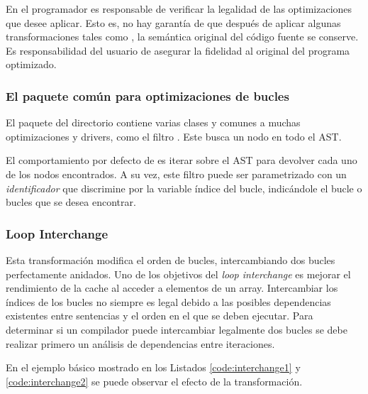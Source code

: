En \yacf{} el programador es responsable de verificar la legalidad de las optimizaciones 
que desee aplicar.
Esto es, no hay garantía de que después de aplicar algunas transformaciones tales como 
\tiling{},
la semántica original del código fuente se conserve.
Es responsabilidad del usuario de \yacf{} asegurar la fidelidad al original del programa
optimizado.
\subsubsection{El paquete común para optimizaciones de bucles	}
\noindent
El paquete  del directorio  contiene
varias clases  y  comunes a muchas optimizaciones y drivers, como
el filtro .
Este  busca un nodo  en todo el \ac{AST}.

El comportamiento por defecto de  es iterar sobre el \ac{AST} para devolver
cada uno de los nodos  encontrados.
A su vez, este filtro puede ser parametrizado con un \textit{identificador} que 
discrimine por la variable índice del bucle, indicándole el bucle o bucles que se desea encontrar.
\subsubsection{Loop Interchange}
\label{subsec:interchange}

\noindent
Esta transformación modifica el orden de bucles, intercambiando dos bucles perfectamente anidados.
Uno de los objetivos del \textit{loop interchange} es mejorar el rendimiento de la cache al acceder a
elementos de un array.
Intercambiar los índices de los bucles no siempre es legal debido a las posibles dependencias existentes
entre sentencias y el orden en el que se deben ejecutar. 
Para determinar si un compilador puede intercambiar legalmente dos bucles se debe realizar primero un 
análisis de dependencias entre iteraciones.


En el ejemplo básico mostrado en los Listados \ref{code:interchange1} y \ref{code:interchange2}
se puede observar el efecto de la transformación.


